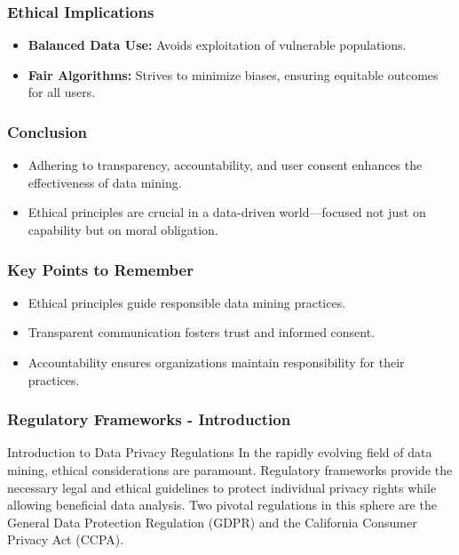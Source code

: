 \documentclass[aspectratio=169]{beamer}
\begin{document}
\begin{frame}[fragile]
    \frametitle{Ethical Implications}
    \begin{itemize}
        \item \textbf{Balanced Data Use:} Avoids exploitation of vulnerable populations.
        \item \textbf{Fair Algorithms:} Strives to minimize biases, ensuring equitable outcomes for all users.
    \end{itemize}
\end{frame}

\begin{frame}[fragile]
    \frametitle{Conclusion}
    \begin{itemize}
        \item Adhering to transparency, accountability, and user consent enhances the effectiveness of data mining.
        \item Ethical principles are crucial in a data-driven world—focused not just on capability but on moral obligation.
    \end{itemize}
\end{frame}

\begin{frame}[fragile]
    \frametitle{Key Points to Remember}
    \begin{itemize}
        \item Ethical principles guide responsible data mining practices.
        \item Transparent communication fosters trust and informed consent.
        \item Accountability ensures organizations maintain responsibility for their practices.
    \end{itemize}
\end{frame}

\begin{frame}[fragile]
    \frametitle{Regulatory Frameworks - Introduction}
    \begin{block}{Introduction to Data Privacy Regulations}
        In the rapidly evolving field of data mining, ethical considerations are paramount. Regulatory frameworks provide the necessary legal and ethical guidelines to protect individual privacy rights while allowing beneficial data analysis. Two pivotal regulations in this sphere are the General Data Protection Regulation (GDPR) and the California Consumer Privacy Act (CCPA).
    \end{block}
\end{frame}
\end{document}
